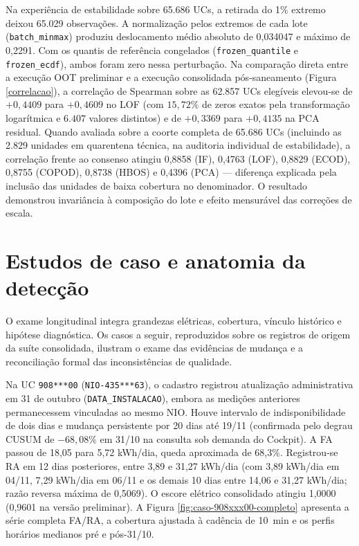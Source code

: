 Na experiência de estabilidade sobre 65.686 UCs, a retirada do 1\% extremo deixou 65.029 observações. A normalização pelos extremos de cada lote (\texttt{batch\_minmax}) produziu deslocamento médio absoluto de 0,034047 e máximo de 0,2291. Com os quantis de referência congelados (\texttt{frozen\_quantile} e \texttt{frozen\_ecdf}), ambos foram zero nessa perturbação. Na comparação direta entre a execução OOT preliminar e a execução consolidada pós-saneamento (Figura \ref{correlacao}), a correlação de Spearman sobre as 62.857 UCs elegíveis elevou-se de $+0{,}4409$ para $+0{,}4609$ no LOF (com $15{,}72\%$ de zeros exatos pela transformação logarítmica e $6.407$ valores distintos) e de $+0{,}3369$ para $+0{,}4135$ na PCA residual. Quando avaliada sobre a coorte completa de 65.686 UCs (incluindo as 2.829 unidades em quarentena técnica, na auditoria individual de estabilidade), a correlação frente ao consenso atingiu 0,8858 (IF), 0,4763 (LOF), 0,8829 (ECOD), 0,8755 (COPOD), 0,8738 (HBOS) e 0,4396 (PCA) — diferença explicada pela inclusão das unidades de baixa cobertura no denominador. O resultado demonstrou invariância à composição do lote e efeito mensurável das correções de escala.

\section{Estudos de caso e anatomia da detecção}\label{estudos-caso-reconciliados}
O exame longitudinal integra grandezas elétricas, cobertura, vínculo histórico e hipótese diagnóstica. Os casos a seguir, reproduzidos sobre os registros de origem da suíte consolidada, ilustram o exame das evidências de mudança e a reconciliação formal das inconsistências de qualidade.

Na UC \texttt{908***00} (\texttt{NIO-435***63}), o cadastro registrou atualização administrativa em 31 de outubro (\texttt{DATA\_INSTALACAO}), embora as medições anteriores permanecessem vinculadas ao mesmo NIO. Houve intervalo de indisponibilidade de dois dias e mudança persistente por 20 dias até 19/11 (confirmada pelo degrau CUSUM de $-68{,}08\%$ em 31/10 na consulta sob demanda do Cockpit). A FA passou de 18,05 para 5,72 kWh/dia, queda aproximada de 68,3\%. Registrou-se RA em 12 dias posteriores, entre 3,89 e 31,27 kWh/dia (com 3,89 kWh/dia em 04/11, 7,29 kWh/dia em 06/11 e os demais 10 dias entre 14,06 e 31,27 kWh/dia; razão reversa máxima de 0,5069). O escore elétrico consolidado atingiu 1,0000 (0,9601 na versão preliminar). A Figura \ref{fig:caso-908xxx00-completo} apresenta a série completa FA/RA, a cobertura ajustada à cadência de 10~min e os perfis horários medianos pré e pós-31/10.

